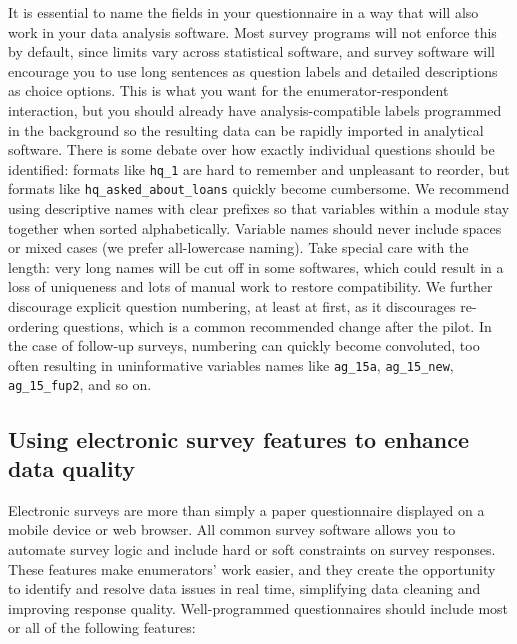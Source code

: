 It is essential to name the fields in your questionnaire
in a way that will also work in your data analysis software.
Most survey programs will not enforce this by default,
since limits vary across statistical software,
and survey software will encourage you
to use long sentences as question labels
and detailed descriptions as choice options.
This is what you want for the enumerator-respondent interaction,
but you should already have analysis-compatible labels programmed in the background
so the resulting data can be rapidly imported in analytical software.
There is some debate over how exactly individual questions should be identified:
formats like \texttt{hq\_1} are hard to remember and unpleasant to reorder,
but formats like \texttt{hq\_asked\_about\_loans} quickly become cumbersome.
We recommend using descriptive names with clear prefixes so that variables
within a module stay together when sorted alphabetically.
Variable names should never include spaces or mixed cases
(we prefer all-lowercase naming).
Take special care with the length: very long names will be cut off in some softwares,
which could result in a loss of uniqueness and lots of manual work to restore compatibility.
We further discourage explicit question numbering,
at least at first, as it discourages re-ordering questions,
which is a common recommended change after the pilot.
In the case of follow-up surveys, numbering can quickly become convoluted,
too often resulting in uninformative variables names like
\texttt{ag\_15a}, \texttt{ag\_15\_new}, \texttt{ag\_15\_fup2}, and so on.

\subsection{Using electronic survey features to enhance data quality}
Electronic surveys are more than simply
a paper questionnaire displayed on a mobile device or web browser.
All common survey software allows you to automate survey logic
and include hard or soft constraints on survey responses.
These features make enumerators' work easier,
and they create the opportunity to identify and resolve
data issues in real time,
simplifying data cleaning and improving response quality.
Well-programmed questionnaires should include
most or all of the following features:

